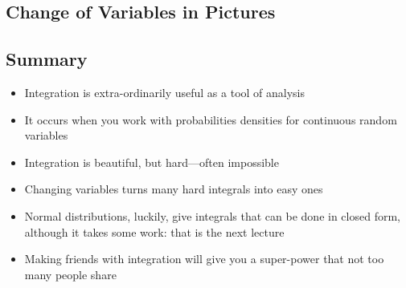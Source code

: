 
\begin{slide}
  \section[-2]{Change of Variables in Pictures}

  \pause \pb{}
  \begin{center}
    \pause
  \end{center}
\end{slide}


\begin{slide}
\section[-1]{Summary}

\begin{PauseHighLight}
  \begin{itemize}
  \item Integration is extra-ordinarily useful as a tool of
    analysis\pause
  \item It occurs when you work with probabilities densities for
    continuous random variables\pause
  \item Integration is beautiful, but hard\pause---often
    impossible\pauseb
  \item Changing variables turns many hard integrals into easy
    ones\pause
  \item Normal distributions, luckily, give integrals that can be done
    in closed form, although it takes some work: that is the next
    lecture\pauseb
  \item Making friends with integration will give you a
    super-power that not too many people share\pauseb
  \end{itemize}
\end{PauseHighLight}

\end{slide}


